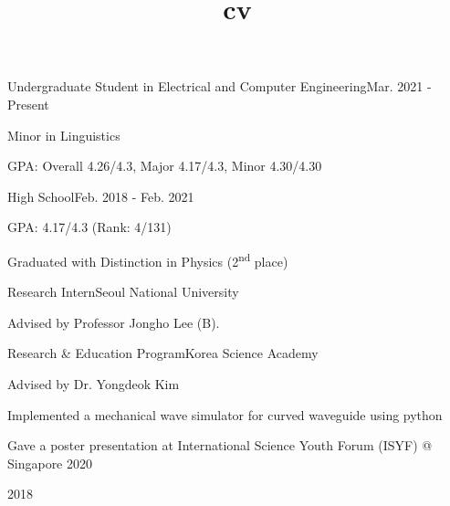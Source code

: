 \documentclass{cv}
\title{cv}
\begin{document}
\cvheader






{Undergraduate Student in Electrical and Computer Engineering}{Mar. 2021 - Present}
{
    \item Minor in Linguistics
    \item GPA: Overall 4.26/4.3, Major 4.17/4.3, Minor 4.30/4.30
}
{High School}{Feb. 2018 - Feb. 2021}
{
    \item GPA: 4.17/4.3 (Rank: 4/131) 
    \item Graduated with Distinction in Physics (2\textsuperscript{nd} place)
}


{Research Intern}{Seoul National University}
{
    \item Advised by Professor Jongho Lee (B).
}

{Research \& Education Program}{Korea Science Academy}
{
    \item Advised by Dr. Yongdeok Kim
    \item Implemented a mechanical wave simulator for curved waveguide using python %
    \item Gave a poster presentation at International Science Youth Forum (ISYF) @ Singapore 2020
}



 {2018}

\vspace{-4mm}
\end{document}
